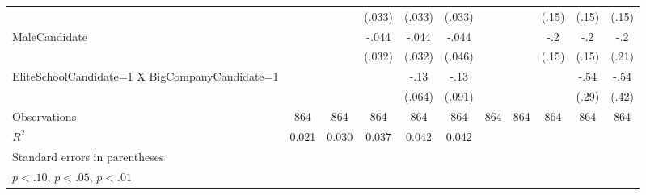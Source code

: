 \begin{sidewaystable}[htbp]
\begin{tabular}{l*{10}{c}}
                    &                     &                     &      (.033)         &      (.033)         &      (.033)         &                     &                     &       (.15)         &       (.15)         &       (.15)         \\
MaleCandidate       &                     &                     &       -.044         &       -.044         &       -.044         &                     &                     &         -.2         &         -.2         &         -.2         \\
                    &                     &                     &      (.032)         &      (.032)         &      (.046)         &                     &                     &       (.15)         &       (.15)         &       (.21)         \\
EliteSchoolCandidate=1 X BigCompanyCandidate=1&                     &                     &                     &        -.13\sym{**} &        -.13         &                     &                     &                     &        -.54\sym{*}  &        -.54         \\
                    &                     &                     &                     &      (.064)         &      (.091)         &                     &                     &                     &       (.29)         &       (.42)         \\
\hline
Observations        &         864         &         864         &         864         &         864         &         864         &         864         &         864         &         864         &         864         &         864         \\
\(R^{2}\)           &       0.021         &       0.030         &       0.037         &       0.042         &       0.042         &                     &                     &                     &                     &                     \\
\hline\hline
\multicolumn{11}{l}{\footnotesize Standard errors in parentheses}\\
\multicolumn{11}{l}{\footnotesize \sym{*} \(p<.10\), \sym{**} \(p<.05\), \sym{***} \(p<.01\)}\\
\end{tabular}
\end{sidewaystable}
